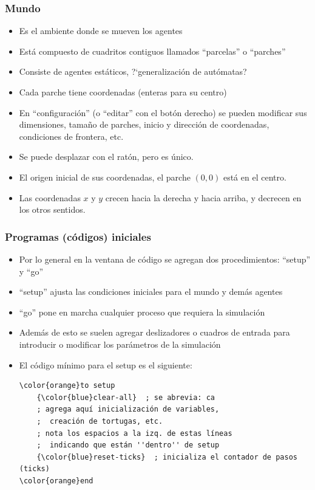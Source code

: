 \documentclass{beamer}
\begin{document}
\begin{frame}[t]
\frametitle{Mundo}
\begin{itemize}[<+->]
	\item Es el ambiente donde se mueven los agentes
	\item Está compuesto de cuadritos contiguos llamados ``parcelas'' o ``parches''
	\item Consiste de agentes estáticos, ?`generalización de autómatas?
	\item Cada parche tiene coordenadas (enteras para su centro)
	\item En ``configuración'' (o ``editar'' con el botón derecho) se pueden modificar sus dimensiones, tamaño de parches, inicio y dirección de coordenadas, condiciones de frontera, etc.
	\item Se puede desplazar con el ratón, pero es único.
	\item El origen inicial de sus coordenadas, el parche $(0,0)$ está en el centro.
	\item Las coordenadas $x$ y $y$ crecen hacia la derecha y hacia arriba, y decrecen en los otros sentidos.
\end{itemize}
\end{frame}


\begin{frame}[fragile]
\frametitle{Programas (códigos) iniciales}
\begin{itemize}[<+->]
	\item Por lo general en la ventana de código se agregan dos procedimientos: ``setup'' y ``go''
	\item ``setup'' ajusta las condiciones iniciales para el mundo y demás agentes
	\item ``go'' pone en marcha cualquier proceso que requiera la simulación
	\item Además de esto se suelen agregar deslizadores o cuadros de entrada para introducir o modificar los parámetros de la simulación
	\item El código mínimo para el setup es el siguiente:
\begin{Verbatim}[commandchars=\\\{\}]
\color{orange}to setup
    {\color{blue}clear-all}  ; se abrevia: ca
    ; agrega aquí inicialización de variables,
    ;  creación de tortugas, etc.
    ; nota los espacios a la izq. de estas líneas
    ;  indicando que están ''dentro'' de setup
    {\color{blue}reset-ticks}  ; inicializa el contador de pasos (ticks)
\color{orange}end
\end{Verbatim}
\end{itemize}
\end{frame}
\end{document}
